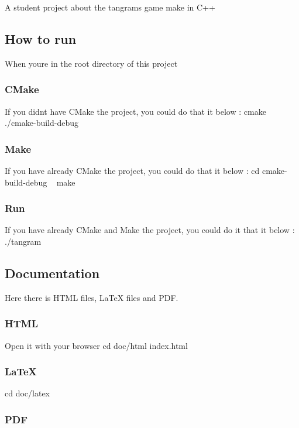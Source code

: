 A student project about the tangram\textquotesingle{}s game make in C++

\subsection*{How to run}

When you\textquotesingle{}re in the root directory of this project ~\newline
~\newline
 \subsubsection*{C\+Make}

If you didn\textquotesingle{}t have C\+Make the project, you could do that it below \+: {\ttfamily cmake ./cmake-\/build-\/debug} \subsubsection*{Make}

If you have already C\+Make the project, you could do that it below \+: {\ttfamily cd cmake-\/build-\/debug} ~\newline
 {\ttfamily make} ~\newline
 \subsubsection*{Run}

If you have already C\+Make and Make the project, you could do it that it below \+: {\ttfamily ./tangram}

\subsection*{Documentation}

Here there is H\+T\+ML files, La\+TeX files and P\+DF. \subsubsection*{H\+T\+ML}

Open it with your browser {\ttfamily cd doc/html} {\ttfamily index.\+html} \subsubsection*{La\+TeX}

{\ttfamily cd doc/latex} \subsubsection*{P\+DF}

